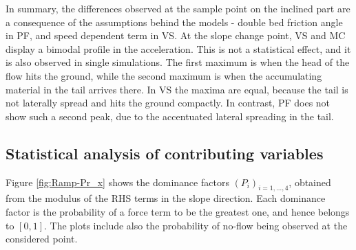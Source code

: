 \documentclass{article}
\begin{document}
In summary, the differences observed at the sample point on the inclined part are a consequence of the assumptions behind the models - double bed friction angle in PF, and speed dependent term in VS. At the slope change point, VS and MC display a bimodal profile in the acceleration. This is not a statistical effect, and it is also observed in single simulations. The first maximum is when the head of the flow hits the ground, while the second maximum is when the accumulating material in the tail arrives there. In VS the maxima are equal, because the tail is not laterally spread and hits the ground compactly. In contrast, PF does not show such a second peak, due to the accentuated lateral spreading in the tail.

\subsection{Statistical analysis of contributing variables}\label{Hq1}
Figure \ref{fig:Ramp-Pr_x} shows the dominance factors $(P_i)_{i=1,\dots,4}$, obtained from the modulus of the RHS terms in the slope direction. Each dominance factor is the probability of a force term to be the greatest one, and hence belongs to $[0,1]$. The plots include also the probability of no-flow being observed at the considered point.
\end{document}
